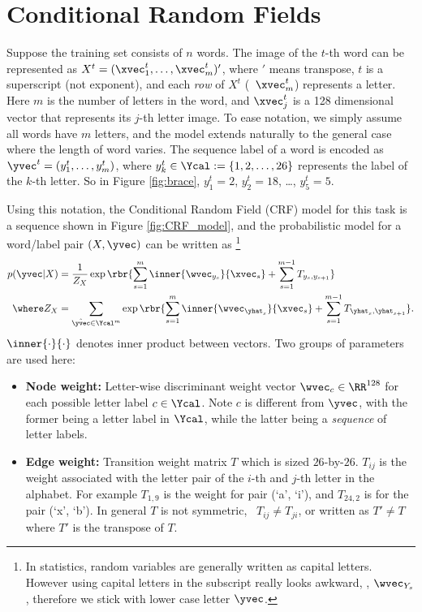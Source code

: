 \documentclass[11pt]{report}
\begin{document}
\section{Conditional Random Fields}

Suppose the training set consists of $n$ words.
The image of the $t$-th word can be represented as
$X^t = (\xvec^t_1, \ldots, \xvec^t_m)'$,
where $'$ means transpose,
$t$ is a superscript (not exponent),
and each \emph{row} of $X^t$ (\eg\ $\xvec^t_m$) represents a letter.
Here $m$ is the number of letters in the word,
and $\xvec^t_j$ is a 128 dimensional vector that represents its $j$-th letter image.
To ease notation, we simply assume all words have $m$ letters,
and the model extends naturally to the general case where the length of word varies.
The sequence label of a word is encoded as
$\yvec^t = (y^t_1, \ldots, y^t_m)$,
where $y^t_k \in \Ycal := \{1, 2, \ldots, 26\}$ represents the label of the $k$-th letter.
So in Figure \ref{fig:brace}, $y^t_1 = 2$, $y^t_2 = 18$, \ldots, $y^t_5 = 5$.

Using this notation, the Conditional Random Field (CRF) model for this task is a sequence shown in Figure \ref{fig:CRF_model},
and the probabilistic model for a word/label pair $(X, \yvec)$ can be written as%
\footnote{In statistics, random variables are generally written as capital letters.
However using capital letters in the subscript really looks awkward, \eg, $\wvec_{Y_s}$,
therefore we stick with lower case letter $\yvec$.}
\begin{align}
	\label{eq:crf}
	p(\yvec | X ) &= \frac{1}{Z_X} \exp \rbr{\sum_{s=1}^m \inner{\wvec_{y_s}}{\xvec_s} + \sum_{s=1}^{m-1} T_{y_s, y_{s+1}}} \\
	\where Z_X &= \sum_{\hat{\yvec} \in \Ycal^m} \exp \rbr{\sum_{s=1}^m \inner{\wvec_{\yhat_s}}{\xvec_s} + \sum_{s=1}^{m-1} T_{\yhat_s, \yhat_{s+1}}}.
\end{align}
%
$\inner{\cdot}{\cdot}$ denotes inner product between vectors.
Two groups of parameters are used here:

\vspace{-1em}
\begin{itemize}
	\item {\bf Node weight:} Letter-wise discriminant weight vector $\wvec_c \in \RR^{128}$ for each possible letter label $c \in \Ycal$.
	Note $c$ is different from $\yvec$,
	with the former being a letter label in $\Ycal$,
	while the latter being a \textit{sequence} of letter labels.
	\item {\bf Edge weight:} Transition weight matrix $T$ which is sized $26$-by-$26$.
	$T_{ij}$ is the weight associated with the letter pair of the $i$-th and $j$-th letter in the alphabet.  For example $T_{1,9}$ is the weight for pair (`a', `i'), and $T_{24,2}$ is for the pair (`x', `b'). In general $T$ is not symmetric, \ie\ $T_{ij} \neq T_{ji}$, or written as $T' \neq T$ where $T'$ is the transpose of $T$.
\end{itemize}
\end{document}
